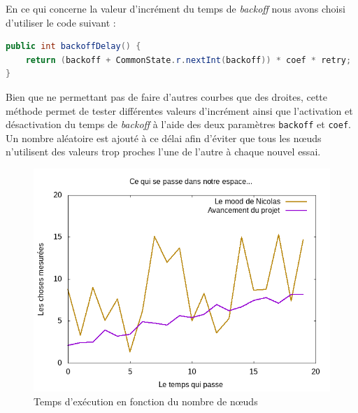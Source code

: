 \documentclass[french]{article}
\begin{document}
En ce qui concerne la valeur d'incrément du temps de \emph{backoff} nous avons choisi d'utiliser le code suivant :

\begin{lstlisting}[language=java]
public int backoffDelay() {
	return (backoff + CommonState.r.nextInt(backoff)) * coef * retry;
}
\end{lstlisting}

Bien que ne permettant pas de faire d'autres courbes que des droites, cette méthode permet de tester différentes valeurs d'incrément ainsi que l'activation et désactivation du temps de \emph{backoff} à l'aide des deux paramètres \lstinline{backoff} et \lstinline{coef}.
Un nombre aléatoire est ajouté à ce délai afin d'éviter que tous les nœuds n'utilisent des valeurs trop proches l'une de l'autre à chaque nouvel essai.

\begin{figure}[ht]
    \centering
    \includegraphics[width=1\textwidth]{test} %
    \caption{Temps d'exécution en fonction du nombre de nœuds}
    \label{fig:time-node}
\end{figure}
\end{document}
